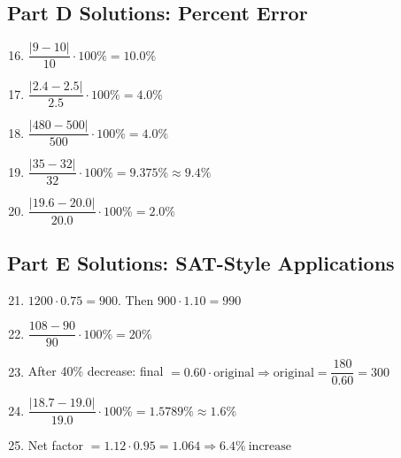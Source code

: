 \documentclass[12pt]{article}
\begin{document}
\subsection*{Part D Solutions: Percent Error}
\begin{enumerate}
  \setcounter{enumi}{15}
  \item \(\dfrac{|9-10|}{10}\cdot100\%=\boxed{10.0\%}\)
  \item \(\dfrac{|2.4-2.5|}{2.5}\cdot100\%=\boxed{4.0\%}\)
  \item \(\dfrac{|480-500|}{500}\cdot100\%=\boxed{4.0\%}\)
  \item \(\dfrac{|35-32|}{32}\cdot100\%=9.375\%\approx\boxed{9.4\%}\)
  \item \(\dfrac{|19.6-20.0|}{20.0}\cdot100\%=\boxed{2.0\%}\)
\end{enumerate}

\subsection*{Part E Solutions: SAT-Style Applications}
\begin{enumerate}
  \setcounter{enumi}{20}
  \item \(1200\cdot0.75=900\). Then \(900\cdot1.10=\boxed{990}\)
  \item \(\dfrac{108-90}{90}\cdot100\%=\boxed{20\%}\)
  \item After 40\% decrease: final \(=0.60\cdot \text{original}\Rightarrow \text{original}=\dfrac{180}{0.60}=\boxed{300}\)
  \item \(\dfrac{|18.7-19.0|}{19.0}\cdot100\%=1.5789\%\approx\boxed{1.6\%}\)
  \item Net factor \(=1.12\cdot0.95=1.064\Rightarrow \boxed{6.4\%\ \text{increase}}\)
\end{enumerate}
\end{document}
